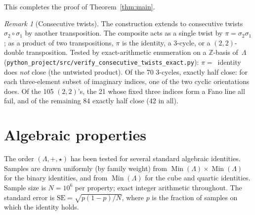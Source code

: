 \documentclass[twoside,english]{paper}
\numberwithin{equation}{section}
\numberwithin{figure}{section}
\theoremstyle{definition}
\theoremstyle{remark}
\newtheorem{remark}[theorem]{Remark}
\newcommand{\ZZ}{\mathbb{Z}}
\newcommand{\LL}{\Lambda}             %
\begin{document}
This completes the proof of Theorem~\ref{thm:main}.

\begin{remark}[Consecutive twists]\label{rem:consecutive-twists}
The construction extends to consecutive twists $\sigma_2 \circ \sigma_1$
by another transposition.  The composite acts as a single twist by
$\pi = \sigma_2 \sigma_1$; as a product of two transpositions, $\pi$
is the identity, a 3-cycle, or a $(2,2)$-double transposition.  Tested
by exact-arithmetic enumeration on a $\ZZ$-basis of~$\LL$
(\texttt{python\_project/src/verify\_consecutive\_twists\_exact.py}):
$\pi = $~identity does \emph{not} close (the untwisted product).  Of
the 70 3-cycles, exactly half close: for each three-element subset
of imaginary indices, one of the two cyclic orientations does.  Of
the 105 $(2,2)$'s, the 21 whose fixed three indices form a Fano line
all fail, and of the remaining 84 exactly half close (42 in all).
\end{remark}

\section{Algebraic properties}\label{sec:properties}

The order $(\LL, +, \star)$ has been tested for several standard
algebraic identities.  Samples are drawn uniformly (by family weight)
from $\operatorname{Min}(\LL) \times \operatorname{Min}(\LL)$ for the
binary identities, and from $\operatorname{Min}(\LL)$ for the cube and
quartic identities.  Sample size is $N = 10^6$ per property; exact
integer arithmetic throughout.  The standard error is $\mathrm{SE} =
\sqrt{p(1-p)/N}$, where $p$ is the fraction of samples on which the
identity holds.
\end{document}
